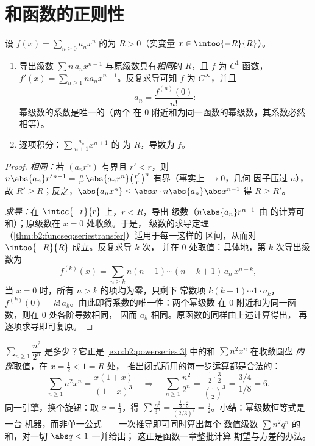 \section{和函数的正则性}

\begin{theorem}[逐项微积分]\label{thm:b2:powerseries:calculus}
设 $f(x) = \sum_{n\geq0} a_n x^n$ 的为 $R > 0$（实变量
$x \in \intoo{-R}{R}$）。
\begin{enumerate}
  \item 导出级数 $\sum n\,a_n x^{n-1}$ 与原级数具有\emph{相同}的
         $R$，且 $f$ 为 $C^1$ 函数，$f'(x) = \sum_{n \geq 1}
        n a_n x^{n-1}$。反复求导可知 $f$ 为 $C^\infty$，并且
        \[
        a_n = \frac{f^{(n)}(0)}{n!} :
        \]
        幂级数的系数是唯一的（两个
        在 $0$ 附近和为同一函数的幂级数，其系数必然相等）。
  \item 逐项积分：$\sum \frac{a_n}{n+1}x^{n+1}$ 的
        为 $R$，导数为 $f$。
\end{enumerate}
\end{theorem}

\begin{proof}
\emph{相同：}若 $(a_nr^n)$ 有界且 $r' < r$，则
$n\abs{a_n} r'^{\,n-1} = \frac{n}{r'}\abs{a_nr^n}
\bigl(\frac{r'}{r}\bigr)^n$ 有界（事实上 $\to 0$，几何
因子压过 $n$），故 $R' \geq R$；反之，$\abs{a_n x^n} \leq \abs x
\cdot n\abs{a_n}\abs x^{n-1}$ 得 $R \geq R'$。

\emph{求导：}在 $\intcc{-r}{r}$ 上，$r < R$，导出
级数（$n\abs{a_n}r^{n-1}$ 由
的计算可和）；原级数在 $x = 0$ 处收敛。于是，
级数的求导定理
（\cref{thm:b2:funcseq:seriestransfer}）适用于每一这样的
区间，从而对 $\intoo{-R}{R}$ 成立。反复求导 $k$ 次，
并在 $0$ 处取值：具体地，第 $k$ 次导出级数为
\[
f^{(k)}(x) = \sum_{n\geq k} n(n-1)\cdots(n-k+1)\,a_n\,x^{n-k},
\]
当 $x = 0$ 时，所有 $n > k$ 的项均为零，只剩下
常数项 $k(k-1)\cdots1\cdot a_k$，$f^{(k)}(0) =
k!\,a_k$。由此即得系数的唯一性：两个幂级数
在 $0$ 附近和为同一函数，则在 $0$ 处各阶导数相同，
因而 $a_k$ 相同。原函数的同样由上述计算得出，
再逐项求导即可复原。
\end{proof}

\begin{example}[在一点处计算级数]\label{ex:b2:powerseries:evaluate}
$\sum_{n\geq1}\dfrac{n^2}{2^n}$ 是多少？它正是
\cref{exo:b2:powerseries:3} 中的和 $\sum n^2x^n$ 在收敛圆盘
\emph{内部}取值，在 $x = \frac12 < 1 = R$ 处，
推出闭式所用的每一步运算都是合法的：
\[
\sum_{n\geq1} n^2x^n = \frac{x(1+x)}{(1-x)^3}
\quad\Longrightarrow\quad
\sum_{n\geq1}\frac{n^2}{2^n}
= \frac{\frac12\cdot\frac32}{(\frac12)^3}
= \frac{3/4}{1/8} = 6 .
\]
同一引擎，换个旋钮：取 $x = \frac13$，得
$\sum\frac{n^2}{3^n} = \frac{\frac13\cdot\frac43}{(2/3)^3} =
\frac32$。小结：幂级数恒等式是一台
机器，而非单一公式——一次推导即可同时算出每个
数值级数 $\sum n^2q^n$ 的和，对一切 $\abs q < 1$ 一并给出；
这正是函数一章整批计算
期望与方差的办法。
\end{example}

